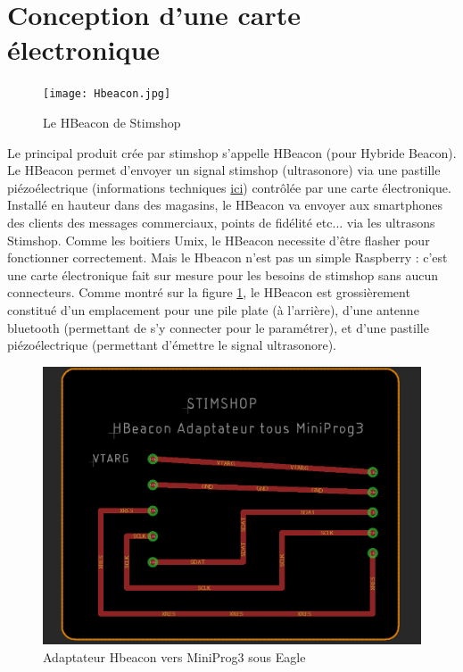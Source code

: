 \documentclass[12pt]{report}
\begin{document}
	\section{Conception d'une carte électronique}

\begin{figure}
\begin{center}
\texttt{[image: Hbeacon.jpg]}
\end{center}
\caption{Le HBeacon de Stimshop}
\label{Le HBeacon de Stimshop}
\end{figure}

Le principal produit crée par stimshop s'appelle HBeacon (pour Hybride Beacon). Le HBeacon permet d'envoyer un signal stimshop (ultrasonore) via une pastille piézoélectrique (informations techniques \href{https://fr.wikipedia.org/wiki/Pi%C3%A9zo%C3%A9lectricit%C3%A9}{ici}) contrôlée par une carte électronique. 
Installé en hauteur dans des magasins, le HBeacon va envoyer aux smartphones des clients des messages commerciaux, points de fidélité etc... via les ultrasons Stimshop. 
Comme les boitiers Umix, le HBeacon necessite d'être flasher pour fonctionner correctement. Mais le Hbeacon n'est pas un simple Raspberry : c'est une carte électronique fait sur mesure pour les besoins de stimshop sans aucun connecteurs. Comme montré sur la figure \ref{Le HBeacon de Stimshop}, le HBeacon est grossièrement constitué d'un emplacement pour une pile plate (à l'arrière), d'une antenne bluetooth (permettant de s'y connecter pour le paramétrer), et d'une pastille piézoélectrique (permettant d'émettre le signal ultrasonore). 

\begin{figure}
\begin{center}
\includegraphics[scale=0.5]{Adapter.PNG}
\end{center}
\caption{Adaptateur Hbeacon vers MiniProg3 sous Eagle}
\label{Adaptateur Hbeacon vers MiniProg3 sous Eagle}
\end{figure}
\end{document}
